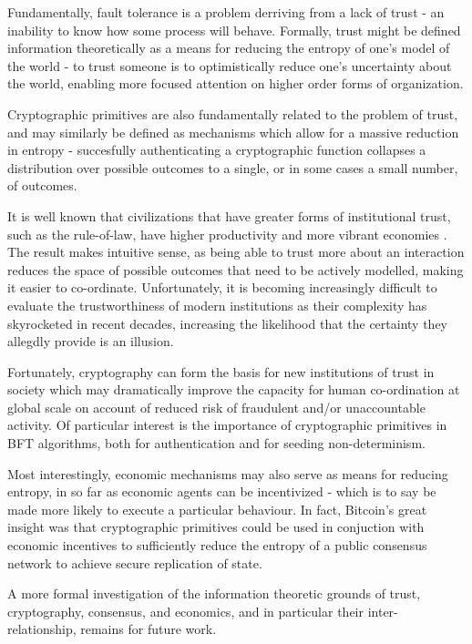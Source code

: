 Fundamentally, fault tolerance is a problem derriving from a lack of trust - 
an inability to know how some process will behave.
Formally, trust might be defined information theoretically as a means
for reducing the entropy of one's model of the world - 
to trust someone is to optimistically reduce one's uncertainty about the world,
enabling more focused attention on higher order forms of organization.

Cryptographic primitives are also fundamentally related to the problem of trust,
and may similarly be defined as mechanisms which allow for a massive reduction in entropy -
succesfully authenticating a cryptographic function collapses a distribution 
over possible outcomes to a single, or in some cases a small number, of outcomes.

It is well known that civilizations that have greater forms of institutional trust,
such as the rule-of-law, 
have higher productivity and more vibrant economies \cite{zak2001trust}.
The result makes intuitive sense, as being able to trust more about an interaction 
reduces the space of possible outcomes that need to be actively modelled,
making it easier to co-ordinate.
Unfortunately, it is becoming increasingly difficult to evaluate the trustworthiness 
of modern institutions as their complexity has skyrocketed in recent decades,
increasing the likelihood that the certainty they allegdly provide is an illusion.

Fortunately, cryptography can form the basis for new institutions of trust in society 
which may dramatically improve the capacity for human co-ordination at global scale on account
of reduced risk of fraudulent and/or unaccountable activity.
Of particular interest is the importance of cryptographic primitives in BFT algorithms,
both for authentication and for seeding non-determinism.

Most interestingly, economic mechanisms may also serve as means for reducing entropy,
in so far as economic agents can be incentivized - 
which is to say be made more likely to execute a particular behaviour.
In fact, Bitcoin's great insight was that cryptographic primitives could be used in
conjuction with economic incentives to sufficiently reduce the entropy of a public consensus network
to achieve secure replication of state.

A more formal investigation of the information theoretic grounds of trust, cryptography,
consensus, and economics, and in particular their inter-relationship, remains for future work.

